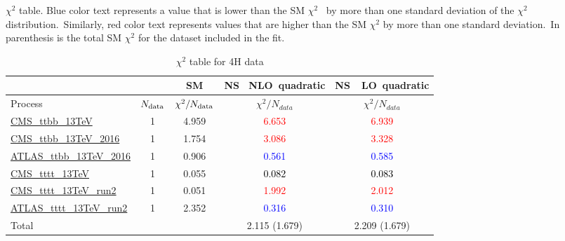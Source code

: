 \documentclass{article}
\begin{document}
$\chi^2$ table. Blue color text represents a value that is lower than the SM $\chi^2$ \
            by more than one standard deviation of the $\chi^2$ distribution.\
            Similarly, red color text represents values that are higher than the SM $\chi^2$ by more than one standard deviation.\
            In parenthesis is the total SM $\chi^2$ for the dataset included in the fit. \\
\begin{table}[H]
\centering
\begin{tabular}{|l|c|c|c|c|}
\hline
 \multicolumn{2}{|c|}{} & SM& \rm NS \ NLO\ quadratic& \rm NS\ \ LO\ quadratic\\ \hline
Process & $N_{\rm data}$ & $\chi^ 2/N_{\rm data}$& $\chi^ 2/N_{data}$& $\chi^ 2/N_{data}$\\ \hline
\href{https://arxiv.org/abs/1705.10141}{CMS_ttbb_13TeV} & 1 & 4.959 & \textcolor{red}                            {6.653} & \textcolor{red}                            {6.939} \\ \hline
\href{https://arxiv.org/abs/1909.05306}{CMS_ttbb_13TeV_2016} & 1 & 1.754 & \textcolor{red}                            {3.086} & \textcolor{red}                            {3.328} \\ \hline
\href{https://arxiv.org/abs/1811.12113}{ATLAS_ttbb_13TeV_2016} & 1 & 0.906 & \textcolor{blue}                            {0.561} & \textcolor{blue}                            {0.585} \\ \hline
\href{https://arxiv.org/abs/1710.10614}{CMS_tttt_13TeV} & 1 & 0.055 & \textcolor{black}                            {0.082} & \textcolor{black}                            {0.083} \\ \hline
\href{https://arxiv.org/abs/1908.06463}{CMS_tttt_13TeV_run2} & 1 & 0.051 & \textcolor{red}                            {1.992} & \textcolor{red}                            {2.012} \\ \hline
\href{https://arxiv.org/abs/2007.14858}{ATLAS_tttt_13TeV_run2} & 1 & 2.352 & \textcolor{blue}                            {0.316} & \textcolor{blue}                            {0.310} \\ \hline
\hline Total & &  & 2.115 (1.679) & 2.209 (1.679) \\ \hline
\end{tabular}
\caption{$\chi^2$ table for 4H data}
\end{table}
\end{document}
